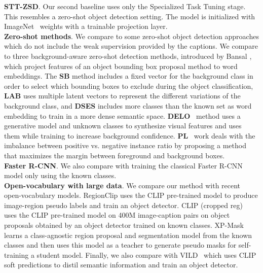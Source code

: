 \textbf{STT-ZSD}. Our second baseline uses only the Specialized Task Tuning stage. This resembles a zero-shot object detection setting. 
The model is initialized with ImageNet~\cite{5206848} weights with a trainable projection layer.\\
\textbf{Zero-shot methods}. We compare to some zero-shot object detection approaches which do not include the weak supervision provided by the captions. We compare to three background-aware zero-shot detection methods, introduced by Bansal \etal \cite{bansal2018zero}, which project features of an object bounding box proposal method to word embeddings. The \textbf{SB} method includes a fixed vector for the background class in order to select which bounding boxes to exclude during the object classification, \textbf{LAB} uses multiple latent vectors to represent the different variations of the background class, and \textbf{DSES} includes more classes than the known set as word embedding to train in a more dense semantic space. \textbf{DELO}~\cite{Zhu_2020_CVPR} method uses a generative model and unknown classes to synthesize visual features and uses them while training to increase background confidence. \textbf{PL}~\cite{Rahman_Khan_Barnes_2020} work deals with the imbalance between positive vs. negative instance ratio by proposing a method that maximizes the margin between foreground and background boxes. \\
\textbf{Faster R-CNN}. We also compare with training the classical Faster R-CNN model only using the known classes.\\
\textbf{Open-vocabulary with large data}. We compare our method with recent open-vocabulary models. RegionClip \cite{zhong2021regionclip} uses the CLIP \cite{radford2021learning} pre-trained model to produce image-region pseudo labels and train an object detector. CLIP (cropped reg)~\cite{gu2022openvocabulary} uses the CLIP pre-trained model on 400M image-caption pairs on object proposals obtained by an object detector trained on known classes. XP-Mask \cite{huynh2021open} learns a class-agnostic region proposal and segmentation model from the known classes and then uses this model as a teacher to generate pseudo masks for self-training a student model. Finally, we also compare with VILD~\cite{gu2022openvocabulary} which uses CLIP soft predictions to distil semantic information and train an object detector.


